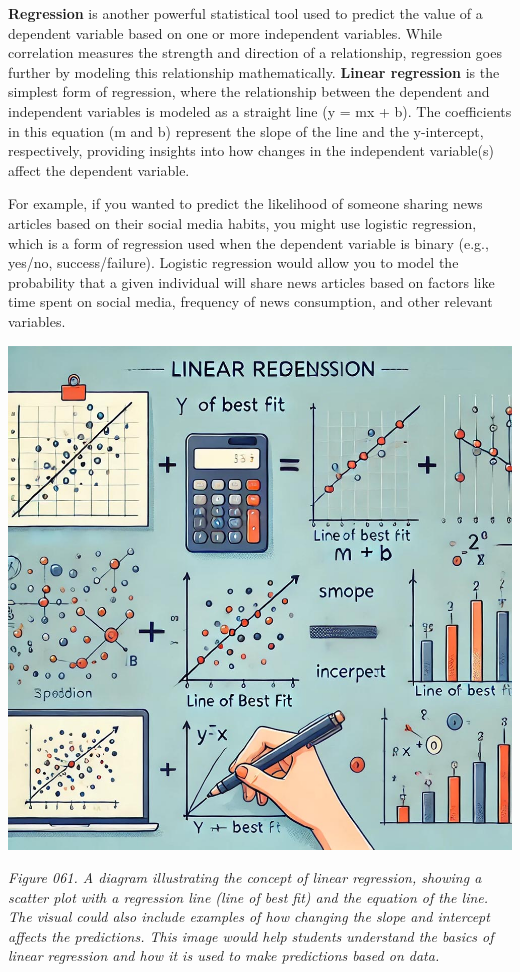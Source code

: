 \documentclass[
]{book}
\begin{document}
\textbf{Regression} is another powerful statistical tool used to predict the value of a dependent variable based on one or more independent variables. While correlation measures the strength and direction of a relationship, regression goes further by modeling this relationship mathematically. \textbf{Linear regression} is the simplest form of regression, where the relationship between the dependent and independent variables is modeled as a straight line (y = mx + b). The coefficients in this equation (m and b) represent the slope of the line and the y-intercept, respectively, providing insights into how changes in the independent variable(s) affect the dependent variable.

For example, if you wanted to predict the likelihood of someone sharing news articles based on their social media habits, you might use logistic regression, which is a form of regression used when the dependent variable is binary (e.g., yes/no, success/failure). Logistic regression would allow you to model the probability that a given individual will share news articles based on factors like time spent on social media, frequency of news consumption, and other relevant variables.

\includegraphics[width=1\textwidth,height=\textheight]{images/fig061.jpg}

\emph{Figure 061. A diagram illustrating the concept of linear regression, showing a scatter plot with a regression line (line of best fit) and the equation of the line. The visual could also include examples of how changing the slope and intercept affects the predictions. This image would help students understand the basics of linear regression and how it is used to make predictions based on data.}
\end{document}
